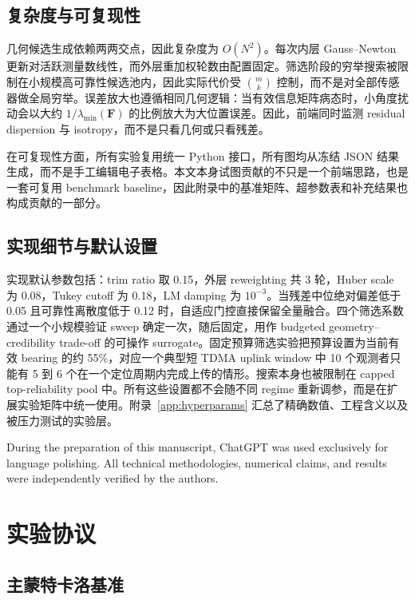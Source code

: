 \documentclass[drones,article,submit,moreauthors]{Definitions/mdpi}
\begin{document}
\subsection{复杂度与可复现性}

几何候选生成依赖两两交点，因此复杂度为 $O(N^2)$。每次内层 Gauss--Newton 更新对活跃测量数线性，而外层重加权轮数由配置固定。筛选阶段的穷举搜索被限制在小规模高可靠性候选池内，因此实际代价受 $\binom{m}{k}$ 控制，而不是对全部传感器做全局穷举。误差放大也遵循相同几何逻辑：当有效信息矩阵病态时，小角度扰动会以大约 $1/\lambda_{\min}(\mathbf{F})$ 的比例放大为大位置误差。因此，前端同时监测 residual dispersion 与 isotropy，而不是只看几何或只看残差。

在可复现性方面，所有实验复用统一 Python 接口，所有图均从冻结 JSON 结果生成，而不是手工编辑电子表格。本文本身试图贡献的不只是一个前端思路，也是一套可复用 benchmark baseline，因此附录中的基准矩阵、超参数表和补充结果也构成贡献的一部分。

\subsection{实现细节与默认设置}

实现默认参数包括：trim ratio 取 0.15，外层 reweighting 共 3 轮，Huber scale 为 0.08，Tukey cutoff 为 0.18，LM damping 为 $10^{-3}$。当残差中位绝对偏差低于 0.05 且可靠性离散度低于 0.12 时，自适应门控直接保留全量融合。四个筛选系数通过一个小规模验证 sweep 确定一次，随后固定，用作 budgeted geometry--credibility trade-off 的可操作 surrogate。固定预算筛选实验把预算设置为当前有效 bearing 的约 55\%，对应一个典型短 TDMA uplink window 中 10 个观测者只能有 5 到 6 个在一个定位周期内完成上传的情形。搜索本身也被限制在 capped top-reliability pool 中。所有这些设置都不会随不同 regime 重新调参，而是在扩展实验矩阵中统一使用。附录~\ref{app:hyperparams} 汇总了精确数值、工程含义以及被压力测试的实验层。

During the preparation of this manuscript, ChatGPT was used exclusively for language polishing. All technical methodologies, numerical claims, and results were independently verified by the authors.

\section{实验协议}

\subsection{主蒙特卡洛基准}
\end{document}

